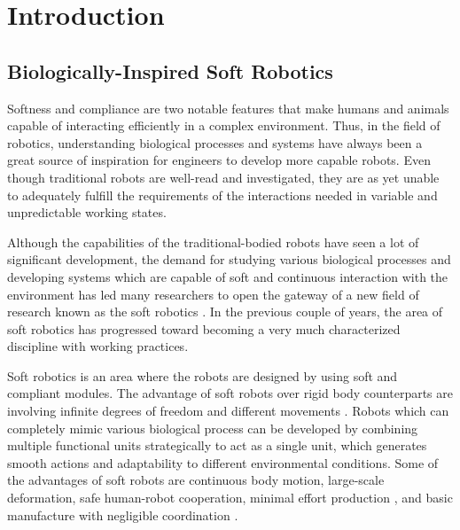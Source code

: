 \chapter{Introduction}\label{ch:introduction}


\section{Biologically-Inspired Soft Robotics}

Softness and compliance are two notable features that make humans
and animals capable of interacting efficiently in a complex environment.
Thus, in the field of robotics, understanding biological processes
and systems have always been a great source of inspiration for engineers
to develop more capable robots. Even though traditional robots
are well-read and investigated, they are as yet unable to adequately
fulfill the requirements of the interactions needed in variable and
unpredictable working states.

Although the capabilities of the traditional-bodied robots have seen
a lot of significant development, the demand for studying various
biological processes and developing systems which are capable of
soft and continuous interaction with the environment has led many
researchers to open the gateway of a new field of research known as
the soft robotics \citep{rus2015}. In the previous couple of years, the area of soft
robotics has progressed toward becoming a very much characterized
discipline with working practices.

Soft robotics is an area where the robots are designed by using soft
and compliant modules. The advantage of soft robots over rigid body
counterparts are involving infinite degrees of freedom and different
movements \citep{Yap2016}. Robots which can completely mimic various biological
process can be developed by combining multiple functional units
strategically to act as a single unit, which generates smooth actions
and adaptability to different environmental conditions. Some of the
advantages of soft robots are continuous body motion, large-scale
deformation, safe human-robot cooperation, minimal effort production
\citep{Katzschmann2016,Argiolas2016}, and basic manufacture with negligible coordination \citep{Argiolas2016}.

